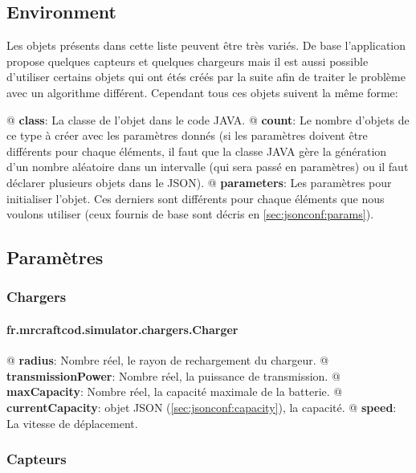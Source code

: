 \documentclass[final]{polytech/polytech}
\begin{document}
		\subsection{Environment\label{sec:jsonconf:env}}
			Les objets présents dans cette liste peuvent être très variés.
			De base l'application propose quelques capteurs et quelques chargeurs mais il est aussi possible d'utiliser certains objets qui ont étés créés par la suite afin de traiter le problème avec un algorithme différent.
			Cependant tous ces objets suivent la même forme:
			\begin{easylist}[itemize]
				@ \textbf{class}: La classe de l'objet dans le code JAVA.
				@ \textbf{count}: Le nombre d'objets de ce type à créer avec les paramètres donnés (si les paramètres doivent être différents pour chaque éléments, il faut que la classe JAVA gère la génération d'un nombre aléatoire dans un intervalle (qui sera passé en paramètres) ou il faut déclarer plusieurs objets dans le JSON).	
				@ \textbf{parameters}: Les paramètres pour initialiser l'objet. Ces derniers sont différents pour chaque éléments que nous voulons utiliser (ceux fournis de base sont décris en \autoref{sec:jsonconf:params}).
			\end{easylist}

		\subsection{Paramètres\label{sec:jsonconf:params}}
			\subsubsection{Chargers}
				\paragraph{fr.mrcraftcod.simulator.chargers.Charger}
					\begin{easylist}[itemize]
						@ \textbf{radius}: Nombre réel, le rayon de rechargement du chargeur.
						@ \textbf{transmissionPower}: Nombre réel, la puissance de transmission.
						@ \textbf{maxCapacity}: Nombre réel, la capacité maximale de la batterie.
						@ \textbf{currentCapacity}: objet JSON (\autoref{sec:jsonconf:capacity}), la capacité.
						@ \textbf{speed}: La vitesse de déplacement.
					\end{easylist}
			
			\subsubsection{Capteurs}
\end{document}
